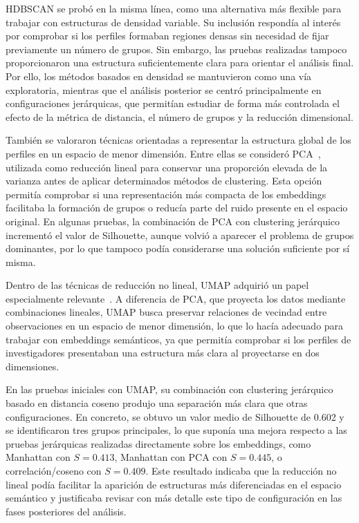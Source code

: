 \documentclass[11pt,spanish,listoffigures,listoftables]{tfgetsinf}
\begin{document}
HDBSCAN se probó en la misma línea, como una alternativa más flexible para trabajar con estructuras de densidad variable. Su inclusión respondía al interés por comprobar si los perfiles formaban regiones densas sin necesidad de fijar previamente un número de grupos. Sin embargo, las pruebas realizadas tampoco proporcionaron una estructura suficientemente clara para orientar el análisis final. Por ello, los métodos basados en densidad se mantuvieron como una vía exploratoria, mientras que el análisis posterior se centró principalmente en configuraciones jerárquicas, que permitían estudiar de forma más controlada el efecto de la métrica de distancia, el número de grupos y la reducción dimensional.

También se valoraron técnicas orientadas a representar la estructura global de los perfiles en un espacio de menor dimensión. Entre ellas se consideró PCA~\cite{jolliffe}, utilizada como reducción lineal para conservar una proporción elevada de la varianza antes de aplicar determinados métodos de clustering. Esta opción permitía comprobar si una representación más compacta de los embeddings facilitaba la formación de grupos o reducía parte del ruido presente en el espacio original. En algunas pruebas, la combinación de PCA con clustering jerárquico incrementó el valor de Silhouette, aunque volvió a aparecer el problema de grupos dominantes, por lo que tampoco podía considerarse una solución suficiente por sí misma.

Dentro de las técnicas de reducción no lineal, UMAP adquirió un papel especialmente relevante~\cite{umap}. A diferencia de PCA, que proyecta los datos mediante combinaciones lineales, UMAP busca preservar relaciones de vecindad entre observaciones en un espacio de menor dimensión, lo que lo hacía adecuado para trabajar con embeddings semánticos, ya que permitía comprobar si los perfiles de investigadores presentaban una estructura más clara al proyectarse en dos dimensiones.

En las pruebas iniciales con UMAP, su combinación con clustering jerárquico basado en distancia coseno produjo una separación más clara que otras configuraciones. En concreto, se obtuvo un valor medio de Silhouette de 0.602 y se identificaron tres grupos principales, lo que suponía una mejora respecto a las pruebas jerárquicas realizadas directamente sobre los embeddings, como Manhattan con \(S=0.413\), Manhattan con PCA con \(S=0.445\), o correlación/coseno con \(S=0.409\). Este resultado indicaba que la reducción no lineal podía facilitar la aparición de estructuras más diferenciadas en el espacio semántico y justificaba revisar con más detalle este tipo de configuración en las fases posteriores del análisis.
\end{document}
